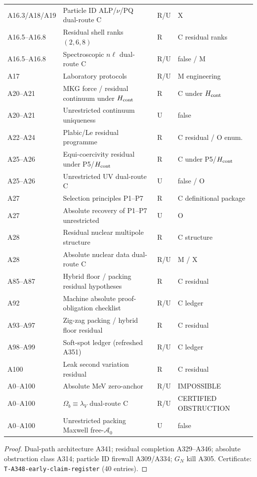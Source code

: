 \begin{center}
{\begin{tabular}{@{}p{2.4cm}p{5.6cm}p{1.2cm}p{3.0cm}@{}}
A16.3/A18/A19 & Particle ID ALP/$\nu$/PQ dual-route C & R/U & X \\
A16.5--A16.8 & Residual shell ranks $(2,6,8)$ & R & C residual ranks \\
A16.5--A16.8 & Spectroscopic $n\ell$ dual-route C & R/U & false / M \\
A17 & Laboratory protocols & R/U & M engineering \\
A20--A21 & MKG force / residual continuum under $H_{\rm cont}$ & R & C under $H_{\rm cont}$ \\
A20--A21 & Unrestricted continuum uniqueness & U & false \\
A22--A24 & Plabic/Le residual programme & R & C residual / O enum. \\
A25--A26 & Equi-coercivity residual under P5/$H_{\rm cont}$ & R & C under P5/$H_{\rm cont}$ \\
A25--A26 & Unrestricted UV dual-route C & U & false / O \\
A27 & Selection principles P1--P7 & R & C definitional package \\
A27 & Absolute recovery of P1--P7 unrestricted & U & O \\
A28 & Residual nuclear multipole structure & R & C structure \\
A28 & Absolute nuclear data dual-route C & R/U & M / X \\
A85--A87 & Hybrid floor / packing residual hypotheses & R & C residual \\
A92 & Machine absolute proof-obligation checklist & R/U & C ledger \\
A93--A97 & Zig-zag packing / hybrid floor residual & R & C residual \\
A98--A99 & Soft-spot ledger (refreshed A351) & R/U & C ledger \\
A100 & Leak second variation residual & R & C residual \\
A0--A100 & Absolute MeV zero-anchor & R/U & IMPOSSIBLE \\
A0--A100 & $\Omega_b\equiv\lambda_V$ dual-route C & R/U & CERTIFIED OBSTRUCTION \\
A0--A100 & Unrestricted packing Maxwell free-$\mathcal{A}_0$ & U & false \\
\bottomrule
\end{tabular}}
\end{center}

\begin{proof}
Dual-path architecture A341; residual completion A329--A346; absolute obstruction class A314; particle ID firewall A309/A334; $G_N$ kill A305.
Certificate: \texttt{T-A348-early-claim-register} (40 entries).
\end{proof}


